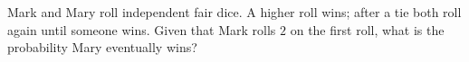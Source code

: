 Mark and Mary roll independent fair dice. A higher roll wins; after a tie both roll again until someone wins. Given that Mark rolls $2$ on the first roll, what is the probability Mary eventually wins?
